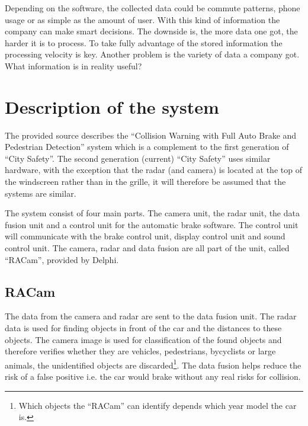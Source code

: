 \documentclass[conference]{IEEEtran}
\begin{document}
Depending on the software, the collected data could be commute patterns, phone usage or as simple as the amount of user. With this kind of information the company can make smart decisions. The downside is, the more data one got, the harder it is to process. To take fully advantage of the stored information the processing velocity is key. Another problem is the variety of data a company got. What information is in reality useful? \cite{SpeedDataEco} %


\section{Description of the system}
The provided source describes the ``Collision Warning with Full Auto Brake and Pedestrian Detection'' system which is a complement to the first generation of ``City Safety''. The second generation (current) ``City Safety'' uses similar hardware, with the exception that the radar (and camera) is located at the top of the windscreen rather than in the grille, it will therefore be assumed that the systems are similar. \cite{SysDescription,RACam,DelphiVolvo}

The system consist of four main parts. The camera unit, the radar unit, the data fusion unit and a control unit for the automatic brake software. The control unit will communicate with the brake control unit, display control unit and sound control unit. The camera, radar and data fusion are all part of the unit, called ``RACam'', provided by Delphi. \cite{SysDescription,DelphiVolvo}

\subsection{RACam}
The data from the camera and radar are sent to the data fusion unit. The radar data is used for finding objects in front of the car and the distances to these objects. The camera image is used for classification of the found objects and therefore verifies whether they are vehicles, pedestrians, bycyclists or large animals, the unidentified objects are discarded\footnote{Which objects the ``RACam'' can identify depends which year model the car is.}. The data fusion helps reduce the risk of a false positive i.e. the car would brake without any real risks for collision.\cite{SysDescription}
\end{document}
